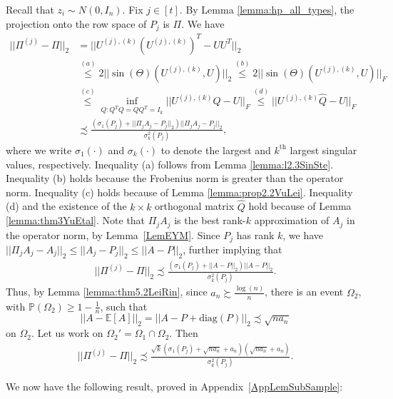 \documentclass{article}
\begin{document}
Recall that $z_i \sim N(0, I_n)$. Fix $j \in [t]$. By Lemma \ref{lemma:hp_all_types}, the projection onto the row space of $P_j$ is $\Pi$. We have 
\begin{align*}
||\Pi^{(j)} - \Pi||_2 &= ||U^{(j), (k)}(U^{(j), (k)})^T - UU^T||_2 \\
%
& \stackrel{(a)}{\leq} 2||\sin(\Theta)(U^{(j), (k)}, U)||_2 \stackrel{(b)}{\leq} 2||\sin(\Theta)(U^{(j), (k)}, U)||_F\\
& \stackrel{(c)}{\leq} \mathop{\inf}_{Q: Q^TQ = QQ^T = I_k}||U^{(j), (k)}Q - U||_F \stackrel{(d)}{\leq} ||U^{(j), (k)}\hat{Q} - U||_F\\
&\precsim \frac{(\sigma_1(P_j) + ||\Pi_jA_j - P_j||_2)||\Pi_jA_j - P_j||_2}{\sigma_k^2(P_j)},
\end{align*}
where we write $\sigma_1(\cdot)$ and $\sigma_k(\cdot)$ to denote the largest and $k^{\text{th}}$ largest singular values, respectively. Inequality (a) follows from Lemma \ref{lemma:l2.3SinSte}. Inequality (b) holds because the Frobenius norm is greater than the operator norm. Inequality (c) holds because of Lemma \ref{lemma:prop2.2VuLei}. Inequality (d) and the existence of the $k \times k$ orthogonal matrix $\hat{Q}$ hold because of Lemma \ref{lemma:thm3YuEtal}. Note that $\Pi_jA_j$ is the best rank-$k$ approximation of $A_j$ in the operator norm, by Lemma~\ref{LemEYM}. Since $P_j$ has rank $k$, we have $||\Pi_jA_j - A_j||_2 \leq ||A_j - P_j||_2 \leq ||A - P||_2$, further implying that
\begin{align*}
||\Pi^{(j)} - \Pi||_2 \precsim \frac{(\sigma_1(P_j) + ||A - P||_2)||A - P||_2}{\sigma_k^2(P_j)}.
\end{align*}
Thus, by Lemma \ref{lemma:thm5.2LeiRin}, since $a_n \succsim \frac{\log(n)}{n}$, there is an event $\Omega_2$, with $\mathbb{P}(\Omega_2) \geq 1 - \frac{1}{n}$, such that
\begin{equation*}
||A - \mathbb{E}[A]||_2 = ||A - P + \text{diag}(P)||_2 \precsim \sqrt{na_n}
\end{equation*}
on $\Omega_2$. Let us work on $\Omega_2' = \Omega_1 \cap \Omega_2$. Then
\begin{align*}
||\Pi^{(j)} - \Pi||_2 \precsim \frac{\sqrt{k}(\sigma_1(P_j) + \sqrt{na_n} + a_n)(\sqrt{na_n} + a_n)}{\sigma_k^2(P_j)}.
\end{align*}

We now have the following result, proved in Appendix~\ref{AppLemSubSample}:
\end{document}
